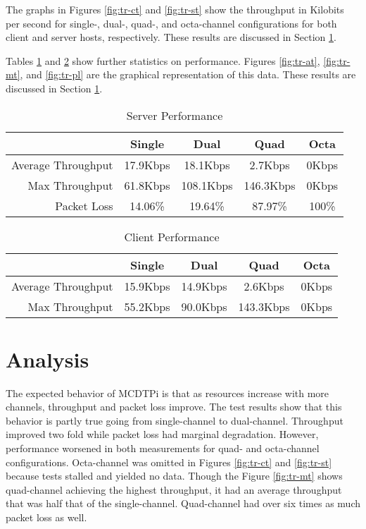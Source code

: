 The graphs in Figures \ref{fig:tr-ct} and \ref{fig:tr-st} show the throughput in Kilobits per second for single-, dual-, quad-, and octa-channel configurations for both client and server hosts, respectively. These results are discussed in Section \ref{sec:anlys}.

Tables \ref{tab:server-perf} and \ref{tab:client-perf} show further statistics on performance. Figures \ref{fig:tr-at}, \ref{fig:tr-mt}, and \ref{fig:tr-pl} are the graphical representation of this data. These results are discussed in Section \ref{sec:anlys}.

\begin{table}[H]
\centering
\caption{Server Performance}
\label{tab:server-perf}
\begin{tabular}{rcccc}
\multicolumn{1}{c}{} & Single    & Dual      & Quad       & Octa  \\
\hline
Average Throughput   & 17.9Kbps  & 18.1Kbps  & 2.7Kbps    & 0Kbps \\
\hline
Max Throughput       & 61.8Kbps  & 108.1Kbps & 146.3Kbps  & 0Kbps \\
\hline
Packet Loss          & 14.06\%   & 19.64\%   & 87.97\%    & 100\%
\end{tabular}
\end{table}

\begin{table}[H]
\centering
\caption{Client Performance}
\label{tab:client-perf}
\begin{tabular}{rcccc}
\multicolumn{1}{c}{} & Single    & Dual      & Quad       & Octa  \\
\hline
Average Throughput   & 15.9Kbps  & 14.9Kbps  & 2.6Kbps    & 0Kbps \\
\hline
Max Throughput       & 55.2Kbps  & 90.0Kbps  & 143.3Kbps  & 0Kbps
\end{tabular}
\end{table}


\section{Analysis}\label{sec:anlys}

The expected behavior of MCDTPi is that as resources increase with more channels, throughput and packet loss improve. The test results show that this behavior is partly true going from single-channel to dual-channel. Throughput improved two fold while packet loss had marginal degradation. However, performance worsened in both measurements for quad- and octa-channel configurations. Octa-channel was omitted in Figures \ref{fig:tr-ct} and \ref{fig:tr-st} because tests stalled and yielded no data. Though the Figure \ref{fig:tr-mt} shows quad-channel achieving the highest throughput, it had an average throughput that was half that of the single-channel. Quad-channel had over six times as much packet loss as well.


